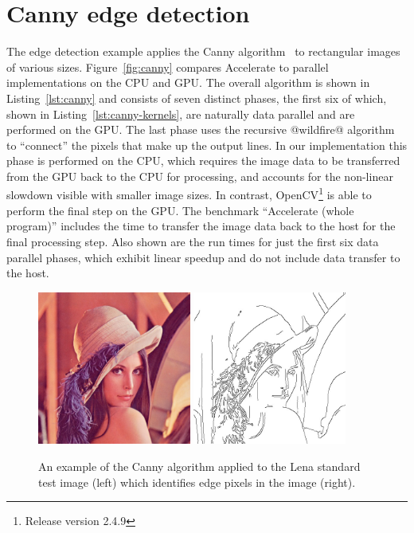 \section{Canny edge detection}
\label{sec:canny}

The edge detection example applies the Canny algorithm~\cite{Canny:1986et} to
rectangular images of various sizes. Figure~\ref{fig:canny} compares Accelerate
to parallel implementations on the CPU and GPU\@. The overall algorithm is shown
in Listing~\ref{lst:canny} and consists of seven distinct phases, the first six
of which, shown in Listing~\ref{lst:canny-kernels}, are naturally data parallel
and are performed on the GPU\@. The last phase uses the recursive @wildfire@
algorithm to ``connect'' the pixels that make up the output lines. In our
implementation this phase is performed on the CPU, which requires the image data
to be transferred from the GPU back to the CPU for processing, and accounts for
the non-linear slowdown visible with smaller image sizes. In contrast,
OpenCV\footnote{Release version 2.4.9} is able to perform the final step on the
GPU\@. The benchmark ``Accelerate (whole program)'' includes the time to
transfer the image data back to the host for the final processing step. Also
shown are the run times for just the first six data parallel phases, which
exhibit linear speedup and do not include data transfer to the host.

\begin{figure}
    \begin{center}
        \includegraphics[width=0.45\textwidth]{images/results/canny/lena}
        \includegraphics[width=0.45\textwidth]{images/results/canny/lena-edges}
    \end{center}
    \caption[Example of the Canny edge detection algorithm]{An example of the
        Canny algorithm applied to the Lena standard test image (left) which
        identifies edge pixels in the image (right).}
    \label{fig:lena}
\end{figure}

